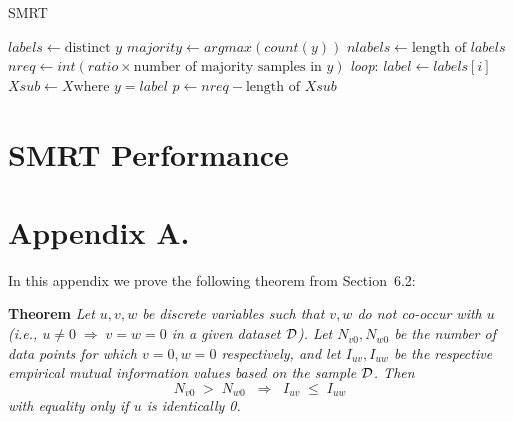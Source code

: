 \documentclass[twoside,11pt]{article}
\newcommand{\dataset}{{\cal D}}
\begin{document}
\begin{algorithm}
\caption{SMRT}\label{smrt}
  \begin{algorithmic}[1]
      \State $labels \gets \text{distinct } \textit{y}$
      \State $majority \gets argmax(count(y))$
      \State $nlabels \gets \text{length of } labels$
      \State $nreq \gets int(ratio \times \text{number of majority samples in } \textit{y})$
      \BState \emph{loop}:
        \State $label \gets labels[i]$
          \State $Xsub \gets X \text{where } y = label$
          \State $p \gets nreq - \text{length of } Xsub$
          \State {}
          \State {}
        \EndIf
      \EndFor
    \EndProcedure
  \end{algorithmic}
\end{algorithm}

\section{SMRT Performance}



\newpage

\appendix
\section*{Appendix A.}
\label{app:theorem}



In this appendix we prove the following theorem from
Section~6.2:

\noindent
{\bf Theorem} {\it Let $u,v,w$ be discrete variables such that $v, w$ do
not co-occur with $u$ (i.e., $u\neq0\;\Rightarrow \;v=w=0$ in a given
dataset $\dataset$). Let $N_{v0},N_{w0}$ be the number of data points for
which $v=0, w=0$ respectively, and let $I_{uv},I_{uw}$ be the
respective empirical mutual information values based on the sample
$\dataset$. Then
\[
  N_{v0} \;>\; N_{w0}\;\;\Rightarrow\;\;I_{uv} \;\leq\;I_{uw}
\]
with equality only if $u$ is identically 0.} \hfill\BlackBox
\end{document}
